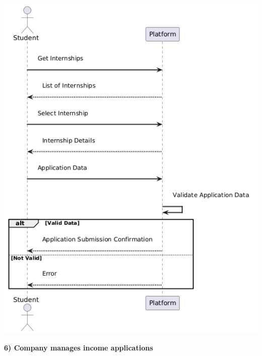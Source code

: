 \begin{center}
    \includegraphics[scale = 0.8]{Images/ImagesRASD/Student_application.png}
\end{center}

\newpage
\textbf{6) Company manages income applications}\\

